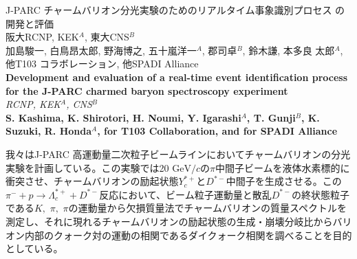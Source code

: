\documentclass[12pt,a4paper,upLaTeX]{jsarticle}
\begin{document}
\vspace{-5pt}
\begin{center}
{\gt \Large J-PARC チャームバリオン分光実験のためのリアルタイム事象識別プロセス の開発と評価 }\\[14pt]

{\gt \large 阪大RCNP, KEK$^A$, 東大CNS$^B$ \\ 加島駿一, 白鳥昂太郎, 野海博之, 五十嵐洋一$^A$, 郡司卓$^B$, 鈴木謙, 本多良
太郎$^A$, 他T103 コラボレーション, 他SPADI Alliance}\\[5pt]


{\large \bf Development and evaluation of a real-time event identification
process for the J-PARC charmed baryon spectroscopy experiment}\\[5pt]

{\large \it RCNP, KEK$^A$, CNS$^B$}\\

{\large \bf S. Kashima, K. Shirotori, H. Noumi, Y. Igarashi$^A$, T. Gunji$^B$, K.
Suzuki, R. Honda$^A$, for T103 Collaboration, and for SPADI Alliance}\\

\end{center}

\vspace{10pt}



我々はJ-PARC 高運動量二次粒子ビームラインにおいてチャームバリオンの分光実験を計画している。この実験では20 $\mathrm{GeV}/c$の$\pi$中間子ビームを液体水素標的に衝突させ、チャームバリオンの励起状態$Y_c^{*+}$と$D^
{*-}$中間子を生成させる。この$\pi^-+p\rightarrow\Lambda_c^{*+}+D^{*-}$反応において、ビーム粒子運動量と散乱$D^{*-}$の終状態粒子である$K,\,\,\pi,\,\,\pi$の運動量から欠損質量法でチャームバリオンの質量スペクトルを測定し、それに現れるチャームバリオンの励起状態の生成・崩壊分岐比からバリオン内部のクォーク対の運動の相関であるダイクォーク相関を調べることを目的としている。
\end{document}
